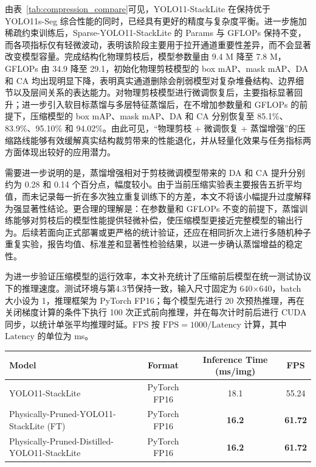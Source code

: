 由表~\ref{tab:compression_compare}可见，YOLO11-StackLite 在保持优于 YOLO11s-Seg 综合性能的同时，已经具有更好的精度与复杂度平衡。进一步施加稀疏约束训练后，Sparse-YOLO11-StackLite 的 Params 与 GFLOPs 保持不变，而各项指标仅有轻微波动，表明该阶段主要用于拉开通道重要性差异，而不会显著改变模型容量。完成结构化物理剪枝后，模型参数量由 9.4 M 降至 7.8 M，GFLOPs 由 34.9 降至 29.1，初始化物理剪枝模型的 box mAP、mask mAP、DA 和 CA 均出现明显下降，表明真实通道删除会削弱模型对复杂堆叠结构、边界细节以及层间关系的表达能力。对物理剪枝模型进行微调恢复后，主要指标显著回升；进一步引入软目标蒸馏与多层特征蒸馏后，在不增加参数量和 GFLOPs 的前提下，压缩模型的 box mAP、mask mAP、DA 和 CA 分别恢复至 85.1\%、83.9\%、95.10\% 和 94.02\%。由此可见，“物理剪枝 + 微调恢复 + 蒸馏增强”的压缩路线能够有效缓解真实结构裁剪带来的性能退化，并从轻量化效果与任务指标两方面体现出较好的应用潜力。

需要进一步说明的是，蒸馏增强相对于剪枝微调模型带来的 DA 和 CA 提升分别约为 0.28 和 0.14 个百分点，幅度较小。由于当前压缩实验表主要报告五折平均值，而未记录每一折在多次独立重复训练下的方差，本文不将该小幅提升过度解释为强显著性结论。更合理的理解是：在参数量和 GFLOPs 不变的前提下，蒸馏训练能够对剪枝后的模型性能提供轻微补偿，使压缩模型更接近完整模型的输出行为。后续若面向正式部署或更严格的统计验证，还应在相同折次上进行多随机种子重复实验，报告均值、标准差和显著性检验结果，以进一步确认蒸馏增益的稳定性。

为进一步验证压缩模型的运行效率，本文补充统计了压缩前后模型在统一测试协议下的推理速度。测试环境与第4.3节保持一致，输入尺寸固定为 640$\times$640，batch 大小设为 1，推理框架为 PyTorch FP16；每个模型先进行 20 次预热推理，再在关闭梯度计算的条件下执行 100 次正式前向推理，并在每次计时前后进行 CUDA 同步，以统计单张平均推理时延。FPS 按 $\mathrm{FPS}=1000/\mathrm{Latency}$ 计算，其中 $\mathrm{Latency}$ 的单位为 ms。

\begin{table}[htbp]
  \label{tab:inference_speed}
  \centering
  \small
  \begin{tabular}{lccc}
    \toprule
    Model & Format & Inference Time (ms/img) & FPS \\
    \midrule
    YOLO11-StackLite & PyTorch FP16 & 18.1 & 55.24 \\
    Physically-Pruned-YOLO11-StackLite (FT) & PyTorch FP16 & \textbf{16.2} & \textbf{61.72} \\
    Physically-Pruned-Distilled-YOLO11-StackLite & PyTorch FP16 & \textbf{16.2} & \textbf{61.72} \\
    \bottomrule
  \end{tabular}
\end{table}

